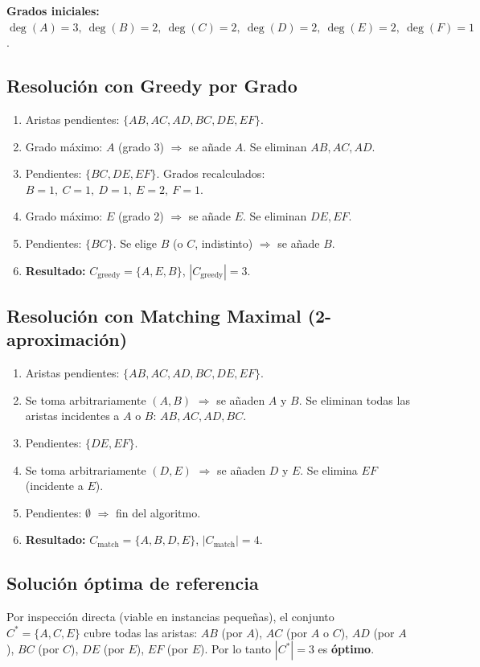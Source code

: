 \documentclass[11pt,a4paper]{article}
\begin{document}
\textbf{Grados iniciales:} $\deg(A)=3,\ \deg(B)=2,\ \deg(C)=2,\ \deg(D)=2,\ \deg(E)=2,\ \deg(F)=1$.

\subsection{Resolución con Greedy por Grado}
\begin{enumerate}[itemsep=1pt]
	\item Aristas pendientes: $\{AB, AC, AD, BC, DE, EF\}$.
	\item Grado máximo: $A$ (grado 3) $\Rightarrow$ se añade $A$. Se eliminan $AB, AC, AD$.
	\item Pendientes: $\{BC, DE, EF\}$. Grados recalculados: $B{=}1,\ C{=}1,\ D{=}1,\ E{=}2,\ F{=}1$.
	\item Grado máximo: $E$ (grado 2) $\Rightarrow$ se añade $E$. Se eliminan $DE, EF$.
	\item Pendientes: $\{BC\}$. Se elige $B$ (o $C$, indistinto) $\Rightarrow$ se añade $B$.
	\item \textbf{Resultado: } $C_{\text{greedy}} = \{A, E, B\}$, \; $|C_{\text{greedy}}| = 3$.
\end{enumerate}

\subsection{Resolución con Matching Maximal (2-aproximación)}
\begin{enumerate}[itemsep=1pt]
	\item Aristas pendientes: $\{AB, AC, AD, BC, DE, EF\}$.
	\item Se toma arbitrariamente $(A,B)$ $\Rightarrow$ se añaden $A$ y $B$. Se eliminan
	todas las aristas incidentes a $A$ o $B$: $AB, AC, AD, BC$.
	\item Pendientes: $\{DE, EF\}$.
	\item Se toma arbitrariamente $(D,E)$ $\Rightarrow$ se añaden $D$ y $E$. Se elimina
	$EF$ (incidente a $E$).
	\item Pendientes: $\emptyset$ $\Rightarrow$ fin del algoritmo.
	\item \textbf{Resultado: } $C_{\text{match}} = \{A, B, D, E\}$, \; $|C_{\text{match}}| = 4$.
\end{enumerate}

\subsection{Solución óptima de referencia}
Por inspección directa (viable en instancias pequeñas), el conjunto
$C^{*} = \{A, C, E\}$ cubre todas las aristas: $AB$ (por $A$), $AC$ (por $A$ o $C$), $AD$
(por $A$), $BC$ (por $C$), $DE$ (por $E$), $EF$ (por $E$). Por lo tanto
$|C^{*}| = 3$ es \textbf{óptimo}.
\end{document}
